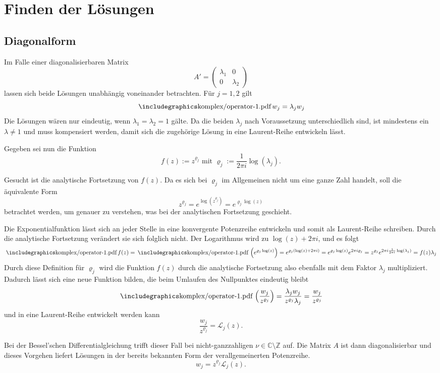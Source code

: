 \section{Finden der Lösungen}
\subsection{Diagonalform}
Im Falle einer diagonalisierbaren Matrix 
$$A'=\begin{pmatrix}\lambda_1 & 0 \\ 0 & \lambda_2 \end{pmatrix}$$
lassen sich beide Lösungen unabhängig voneinander betrachten. Für $j=1,2$ gilt
$$\sk w_j = \lambda_j w_j$$
Die Lösungen wären nur eindeutig, wenn $\lambda_1=\lambda_2=1$ gälte. Da die beiden $\lambda_j$ nach Voraussetzung unterschiedlich sind, ist mindestens ein $\lambda\ne 1$ und  muss kompensiert werden, damit sich die zugehörige Lösung in eine Laurent-Reihe entwickeln lässt.

Gegeben sei nun die Funktion
$$f(z):=z^{\varrho_j} \text{ mit }\varrho_j := \frac{1}{2\pi i}\log(\lambda_j).$$

Gesucht ist die analytische Fortsetzung von $f(z)$. Da es sich bei $\varrho_j$ im Allgemeinen nicht um eine ganze Zahl handelt, soll die äquivalente Form
$$z^{\varrho_j} = e^{\log(z^{\varrho_j})} = e^{\varrho_j \log(z)}$$
betrachtet werden, um genauer zu verstehen, was bei der analytischen Fortsetzung geschieht.

Die Exponentialfunktion lässt sich an jeder Stelle in eine konvergente Potenzreihe entwickeln und somit als Laurent-Reihe schreiben. Durch die analytische Fortsetzung verändert sie sich folglich nicht. Der Logarithmus wird zu $\log(z) + 2\pi i$, und es folgt
$$
\sk f(z)
= \sk \left(e^{\varrho_j \log(z)} \right)
= e^{\varrho_j \left(\log(z) + 2\pi i\right)}
= e^{\varrho_j \log(z)}  e^{2\pi i\varrho_j}
= z^{\varrho_j} e^{2\pi i\frac{1}{2\pi i}\log(\lambda_j)} 
= f(z) \lambda_j
$$
Durch diese Definition für $\varrho_j$ wird die Funktion $f(z)$ durch die analytische Fortsetzung also ebenfalls mit dem Faktor $\lambda_j$ multipliziert. Dadurch lässt sich eine neue Funktion bilden, die beim Umlaufen des Nullpunktes eindeutig bleibt
$$
\sk \left(\frac{w_j}{z^{\varrho_j}}\right) 
= \frac{\lambda_j w_j}{z^{\varrho_j}\lambda_j}
= \frac{w_j}{z^{\varrho_j}}
$$
und in eine Laurent-Reihe entwickelt werden kann
$$\frac{w_j}{z^{\varrho_j}} = \mathcal{L}_j(z).$$

Bei der Bessel'schen Differentialgleichung trifft dieser Fall bei nicht-ganzzahligen $\nu\in\mathbb{C}\setminus\mathbb{Z}$ auf. Die Matrix $A$ ist dann diagonalisierbar und dieses Vorgehen liefert Lösungen in der bereits bekannten Form der verallgemeinerten Potenzreihe.
$$ w_j = z^{\varrho_j}\mathcal{L}_j(z).$$


